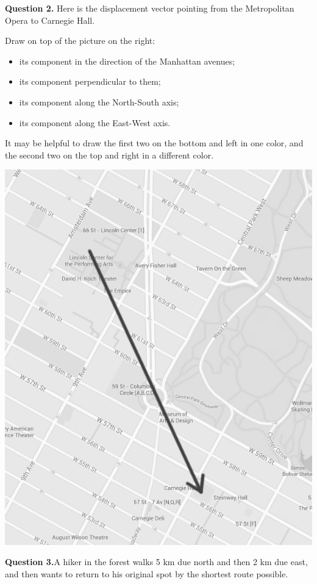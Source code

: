 \documentclass[12pt]{article}
\newcommand{\BI}{\begin{itemize}}
\newcommand{\EI}{\end{itemize}}
\def\BS{\bigskip}
\begin{document}
\begin{minipage}{0.45\textwidth}
{\bf Question 2.} Here is the displacement vector pointing from the Metropolitan Opera to Carnegie Hall.
	\BS
	
	Draw on top of the picture on the right:
	
	\BI
	\item its component in the direction of the Manhattan avenues;
	\item its component perpendicular to them;
	\item its component along the North-South axis;
	\item its component along the East-West axis.
	\EI

	
	It may be helpful to draw the first two on the bottom and left in one color, and the second two on the top and right in a different color.
	\vspace{1in}
	\vspace{3in}	
\end{minipage}
\hspace{0.05\textwidth}
\begin{minipage}{0.48\textwidth}
	
	\begin{center}
		
		
		\includegraphics[width=\textwidth]{manhattan-2.png}
		
	
	\end{center}
\end{minipage}
\newpage
{\bf Question 3.}A hiker in the forest walks 5 km due north and then 2 km due east, and then wants to return to his original spot by the shortest route possible. 
\end{document}
